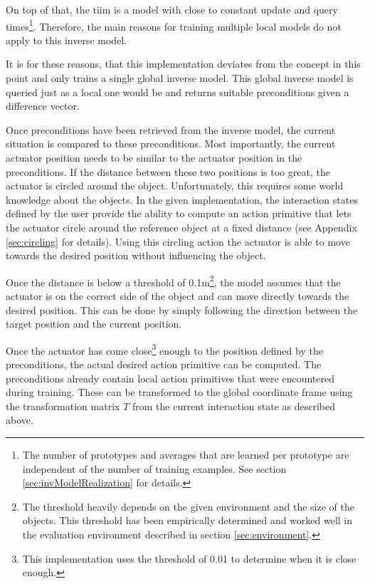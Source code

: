 On top of that, the \gls{tiim} is a model with close to constant update and query times\footnote{The number of prototypes and averages that are learned per prototype are independent of the number of training examples. See section \ref{sec:invModelRealization} for details.}. Therefore, the main reasons for training multiple local models do not apply to this inverse model.

It is for these reasons, that this implementation deviates from the concept in this point and only trains a single global inverse model.
This global inverse model is queried just as a local one would be and returns suitable preconditions given a difference vector.

Once preconditions have been retrieved from the inverse model, the current situation is compared to these preconditions. Most importantly, the current actuator position needs to be similar to the actuator position in the preconditions. If the distance between these two positions is too great, the actuator is circled around the object. Unfortunately, this requires some world knowledge about the objects. In the given implementation, the interaction states defined by the user provide the ability to compute an action primitive that lets the actuator circle around the reference object at a fixed distance (see Appendix \ref{sec:circling} for details). 
Using this circling action the actuator is able to move towards the desired position without influencing the object.

Once the distance is below a threshold of 0.1m\footnote{The threshold heavily depends on the given environment and the size of the objects. This threshold has been empirically determined and worked well in the evaluation environment described in section \ref{sec:environment}.}, the model assumes that the actuator is on the correct side of the object and can move directly towards the desired position. This can be done by simply following the direction between the target position and the current position.

Once the actuator has come close\footnote{This implementation uses the threshold of 0.01 to determine when it is close enough.} enough to the position defined by the preconditions, the actual desired action primitive can be computed. The preconditions already contain local action primitives that were encountered during training. These can be transformed to the global coordinate frame using the transformation matrix $T$ from the current interaction state as described above. 


